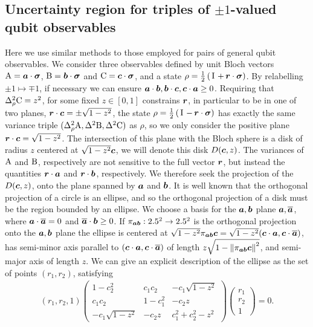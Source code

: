 \subsection{Uncertainty region for triples of $\pm 1$-valued qubit observables}
\label{sec:qubit-triple-uncertainty}

Here we use similar methods to those employed for pairs of general qubit observables. We consider three observables defined by unit Bloch vectors $\operatorname{A} = \bm{a}\cdot{\boldsymbol\sigma}$, $\operatorname{B} = \bm{b}\cdot{\boldsymbol\sigma}$ and $\operatorname{C} = \bm{c}\cdot{\boldsymbol\sigma}$, and a state $\rho = \qbit{\bor}$. By relabelling $\pm 1 \mapsto \mp 1$, if necessary we can ensure $\bm{a}\cdot\bm{b}, \bm{b}\cdot\bm{c}, \bm{c}\cdot\bm{a} \geq 0$. Requiring that $\varr{\opc} = z^2$, for some fixed $z\in [0,1]$ constrains $\bm{r}$, in particular to be in one of two planes, $\bm{r}\cdot\bm{c} = \pm\sqrt{1-z^2}$, the state $\rho = \qbit[][-]{\bor}$ has exactly the same variance triple $(\varr{\opa}, \var{\opb}, \var{\opc})$ as $\rho$, so we only consider the positive plane $\bm{r}\cdot\bm{c} = \sqrt{1-z^2}$. The intersection of this plane with the Bloch sphere is a disk of radius $z$ centered at $\sqrt{1-z^2}\bm{c}$, we will denote this disk $D(\bm{c},z)$. The variances of $\operatorname{A}$ and $\operatorname{B}$, respectively are not sensitive to the full vector $\bm{r}$, but instead the quantities $\bm{r}\cdot\bm{a}$ and $\bm{r}\cdot\bm{b}$, respectively. We therefore seek the projection of the $D(\bm{c},z)$, onto the plane spanned by $\bm{a}$ and $\bm{b}$. It is well known that the orthogonal projection of a circle is an ellipse, and so the orthogonal projection of a disk must be the region bounded by an ellipse. We choose a basis for the $\bm{a},\bm{b}$ plane $\bm{a}, \bm{\overline{a}}$, where $\bm{a}\cdot\bm{\overline{a}}=0$ and $\bm{\overline{a}}\cdot\bm{b} \geq 0$. If $\pi_{{\bm{a}}{\bm{b}}}:2.5^2\to2.5^2$ is the orthogonal projection onto the $\bm{a},\bm{b}$ plane the ellipse is centered at $\sqrt{1-z^2}\pi_{{\bm{a}}{\bm{b}}}\bm{c} = \sqrt{1-z^2}(\bm{c}\cdot\bm{a},\bm{c}\cdot\bm{\overline{a}})$, has semi-minor axis parallel to $(\bm{c}\cdot\bm{a},\bm{c}\cdot\bm{\overline{a}})$ of length $z\sqrt{ 1 - {\left\lVert{\pi_{{\bm{a}}{\bm{b}}}\bm{c}}\right\rVert}^2}$, and semi-major axis of length $z$. We can give an explicit description of the ellipse as the set of points $(r_1, r_2)$, satisfying
\begin{align}
  (r_1, r_2, 1) \begin{pmatrix} 1 - c_2^2& c_1 c_2 & -c_1 \sqrt{1-z^2} \\c_1 c_2 & 1 - c_1^2& -c_2z \\-c_1 \sqrt{1-z^2} & -c_2 z & c_1^2 + c_2^2 -z^2\end{pmatrix} \begin{pmatrix}r_1\\r_2\\1\end{pmatrix} = 0.
\end{align}

